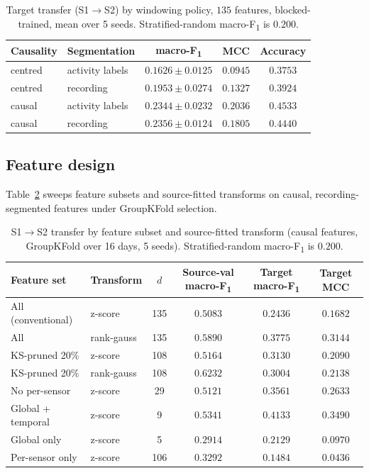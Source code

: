 \documentclass[a4paper,fleqn]{cas-dc}
\newcommand{\macf}{macro-F\textsubscript{1}}
\begin{document}
\begin{table}[t]
\centering
\caption{Target transfer (S1$\to$S2) by windowing policy, $135$ features, blocked-trained,
mean over 5 seeds. Stratified-random \macf{} is $0.200$.}
\label{tab:window-target}
\small
\begin{tabular}{llccc}
\toprule
Causality & Segmentation & \macf & MCC & Accuracy \\
\midrule
centred & activity labels & $0.1626\pm0.0125$ & $0.0945$ & $0.3753$ \\
centred & recording       & $0.1953\pm0.0274$ & $0.1327$ & $0.3924$ \\
causal  & activity labels & $0.2344\pm0.0232$ & $0.2036$ & $0.4533$ \\
causal  & recording       & $\mathbf{0.2356}\pm0.0124$ & $0.1805$ & $0.4440$ \\
\bottomrule
\end{tabular}
\end{table}

\subsection{Feature design}
\label{sec:res-feat}

Table~\ref{tab:features} sweeps feature subsets and source-fitted transforms on causal,
recording-segmented features under GroupKFold selection.

\begin{table}[t]
\centering
\caption{S1$\to$S2 transfer by feature subset and source-fitted transform (causal
features, GroupKFold over 16 days, 5 seeds). Stratified-random \macf{} is $0.200$.}
\label{tab:features}
\small
\begin{tabular}{llcccc}
\toprule
Feature set & Transform & $d$ & Source-val \macf & Target \macf & Target MCC \\
\midrule
All (conventional)    & z-score     & 135 & $0.5083$ & $0.2436$ & $0.1682$ \\
All                   & rank-gauss  & 135 & $0.5890$ & $0.3775$ & $0.3144$ \\
KS-pruned 20\%        & z-score     & 108 & $0.5164$ & $0.3130$ & $0.2090$ \\
KS-pruned 20\%        & rank-gauss  & 108 & $\mathbf{0.6232}$ & $0.3004$ & $0.2138$ \\
No per-sensor         & z-score     & 29  & $0.5121$ & $0.3561$ & $0.2633$ \\
Global + temporal     & z-score     & 9   & $0.5341$ & $\mathbf{0.4133}$ & $\mathbf{0.3490}$ \\
Global only           & z-score     & 5   & $0.2914$ & $0.2129$ & $0.0970$ \\
Per-sensor only       & z-score     & 106 & $0.3292$ & $0.1484$ & $0.0436$ \\
\bottomrule
\end{tabular}
\end{table}
\end{document}
